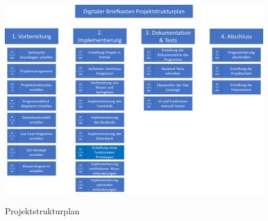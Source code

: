 \pagebreak
\clearpage

\label{PSP}
\begin{figure}[h]
    \centering
    \begin{minipage}[t]{1\textwidth}
        \caption{Projektstrukturplan}
        \includegraphics[width=1\textwidth]{img/PSP.png}\\
    \end{minipage}
\end{figure}

\pagebreak
\clearpage

